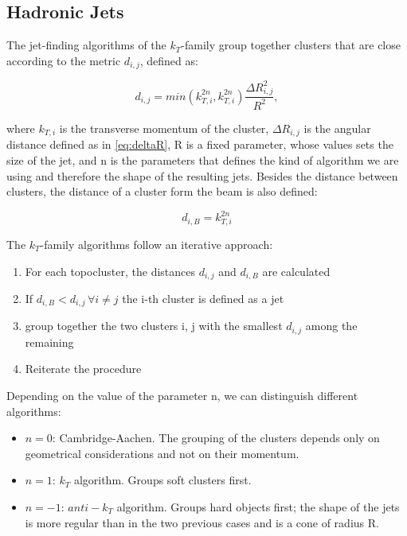 \subsection{Hadronic Jets}

The jet-finding algorithms of the $k_T$-family group together clusters that are close according to the metric $d_{i,j}$, defined as:

\begin{equation}
d_{i,j} = min\left( k_{T,i}^{2n}, k_{T,i}^{2n}  \right) \frac{\Delta R_{i,j}^2}{R^2},
\end{equation}

where $k_{T,i}$ is the transverse momentum of the cluster, $\Delta R_{i,j}$ is the angular distance defined as in \ref{eq:deltaR}, R is a fixed parameter, whose values sets the size of the jet, and n is the parameters that defines the kind of algorithm we are using and therefore the shape of the resulting jets. Besides the distance between clusters, the distance of a cluster form the beam is also defined:

\begin{equation}
d_{i,B} =  k_{T,i}^{2n}
\end{equation}

The $k_T$-family algorithms follow an iterative approach:
\begin{enumerate}
\item For each topocluster, the distances $d_{i,j}$ and $d_{i,B}$ are calculated
\item If $d_{i,B} < d_{i,j} \, \forall i \neq j $ the i-th cluster is defined as a jet
\item group together the two clusters i, j with the smallest $d_{i,j}$ among the remaining
\item Reiterate the procedure
\end{enumerate}

Depending on the value of the parameter n, we can distinguish different algorithms:
\begin{itemize}
\item $n=0$: Cambridge-Aachen. The grouping of the clusters depends only on geometrical considerations and not on their momentum. 
\item $n=1$: $k_T$ algorithm. Groups soft clusters first.
\item $n=-1$: $anti-k_T$ algorithm. Groups hard objects first; the shape of the jets is more regular than in the two previous cases and is a cone of radius R.
\end{itemize}

